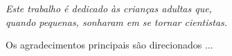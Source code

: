 \documentclass[
	12pt,				%
	openright,			%
	twoside,			%
	a4paper,			%
	english,			%
	french,				%
	spanish,			%
	brazil				%
	]{abntex2}
\begin{document}
    
        

      
  

\begin{dedicatoria}
   \vspace*{\fill}
   \centering
   \noindent
   \textit{Este trabalho é dedicado às crianças adultas que,\\
   quando pequenas, sonharam em se tornar cientistas.} \vspace*{\fill}
\end{dedicatoria}

\begin{agradecimentos}
Os agradecimentos principais são direcionados ...

\end{agradecimentos}
\end{document}
